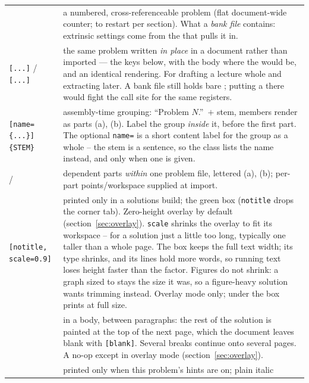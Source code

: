 \begin{center}
\begin{tabularx}{\linewidth}{@{}l Y@{}}
 & a numbered, cross-referenceable problem (flat document-wide
  counter;  to restart per section). What a \emph{bank file}
  contains: extrinsic settings come from the  that pulls it
  in.\\
\texttt{[...]} / \texttt{[...]} & the same
  problem written \emph{in place} in a document rather than imported --- the
   keys below, with the body where the  would be, and
  an identical rendering. For drafting a lecture whole and extracting later. A
  bank file still holds bare ; putting a  there
  would fight the call site for the same registers.\\
\texttt{[name=\{...\}]\{STEM\}} & assembly-time grouping:
  ``Problem $N$.''\ $+$ stem, members render as parts (a), (b). Label the group
  \emph{inside} it, before the first part. The optional \texttt{name=} is a
  short content label for the group as a whole -- the stem is a sentence, so
  the class lists the name instead, and only when one is given.\\
 /  & dependent parts \emph{within} one problem file,
  lettered (a), (b); per-part points/workspace supplied at import.\\
\texttt{[notitle, scale=0.9]} & printed only in a solutions build;
  the green box (\texttt{notitle} drops the corner tab). Zero-height
  overlay by default (section~\ref{sec:overlay}).
  \texttt{scale} shrinks the overlay to fit its workspace -- for a solution just a little too long, typically one taller than a whole page.
  The box keeps the full text width; its type shrinks, and its lines hold more words, so running text loses height faster than the factor.
  Figures do not shrink: a graph sized to  stays the size it was, so a figure-heavy solution wants trimming instead.
  Overlay mode only; under  the box prints at full size.\\
 & in a  body, between paragraphs: the rest
  of the solution is painted at the top of the next page, which the document
  leaves blank with \texttt{[blank]}. Several breaks continue
  onto several pages. A no-op except in overlay mode
  (section~\ref{sec:overlay}).\\
 & printed only when this problem's hints are on; plain italic

\end{tabularx}
\end{center}
